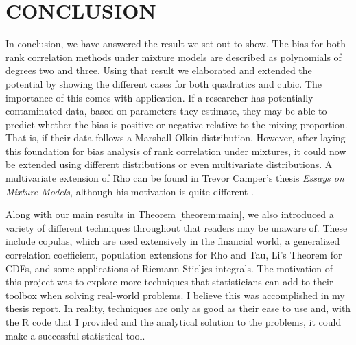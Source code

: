 \chapter{CONCLUSION}
\hspace{24pt} In conclusion, we have answered the result we set out to show. The bias for both rank correlation methods under mixture models are described as polynomials of degrees two and three. Using that result we elaborated and extended the potential by showing the different cases for both quadratics and cubic. The importance of this comes with application. If a researcher has potentially contaminated data, based on parameters they estimate, they may be able to predict whether the bias is positive or negative relative to the mixing proportion. That is, if their data follows a Marshall-Olkin distribution. However, after laying this foundation for bias analysis of rank correlation under mixtures, it could now be extended using different distributions or even multivariate distributions. A multivariate extension of Rho can be found in Trevor Camper's thesis {\it Essays on Mixture Models}, although his motivation is quite different \cite{camper2019}.

Along with our main results in Theorem \ref{theorem:main}, we also introduced a variety of different techniques throughout that readers may be unaware of. These include copulas, which are used extensively in the financial world, a generalized correlation coefficient, population extensions for Rho and Tau, Li's Theorem for CDFs, and some applications of Riemann-Stieljes integrals. The motivation of this project was to explore more techniques that statisticians can add to their toolbox when solving real-world problems. I believe this was accomplished in my thesis report. In reality, techniques are only as good as their ease to use and, with the R code that I provided and the analytical solution to the problems, it could make a successful statistical tool.